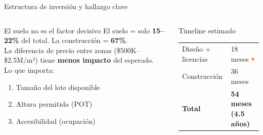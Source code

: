 \documentclass[aspectratio=169, 11pt]{beamer}
\begin{document}
\begin{frame}{Estructura de inversión y hallazgo clave}
\begin{columns}[T]
\begin{block}{\small El suelo no es el factor decisivo}
\footnotesize El suelo = solo \textbf{15--22\%} del total.
La construcción = \textbf{67\%}.\\[3pt]
La diferencia de precio entre zonas (\$500K--\$2.5M/m²) tiene \textbf{menos impacto} del esperado.\\[3pt]
Lo que importa:
\begin{enumerate}\footnotesize
  \item Tamaño del lote disponible
  \item Altura permitida (POT)
  \item Accesibilidad (ocupación)
\end{enumerate}
\end{block}

\vspace{4pt}
\begin{exampleblock}{\small Timeline estimado}
\footnotesize
\begin{tabular}{@{}ll@{}}
Diseño + licencias & 18 meses {\textcolor{coral}{$\blacktriangledown$}} \\
Construcción & 36 meses \\
\textbf{Total} & \textbf{54 meses (4.5 años)} \\
\end{tabular}
\end{exampleblock}
\end{columns}
\end{frame}
\end{document}
